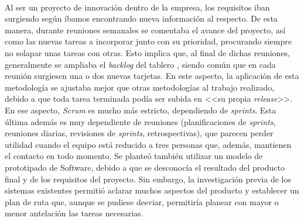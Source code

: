 \documentclass{subfiles}
\begin{document}
        \paragraph{}
        {Al ser un proyecto de innovación dentro de la empresa, los requisitos iban surgiendo según íbamos encontrando nueva información al respecto. De esta manera, durante reuniones semanales se comentaba el avance del proyecto, así como las nuevas tareas a incorporar junto con su prioridad, procurando siempre no solapar unas tareas con otras. Esto implica que, al final de dichas reuniones, generalmente se ampliaba el \textit{backlog} del tablero \Kanban, siendo común que en cada reunión surgiesen una o dos nuevas tarjetas. En este aspecto, la aplicación de esta metodología se ajustaba mejor que otras metodologías al trabajo realizado, debido a que toda tarea terminada podía ser subida en <<su propia \textit{release}>>. En ese aspecto, \textit{Scrum} es mucho más estricto, dependiendo de \textit{sprints}. Esta última además es muy dependiente de reuniones (planificaciones de \textit{sprints}, reuniones diarias, revisiones de \textit{sprints}, retrospectivas), que parecen perder utilidad cuando el equipo está reducido a tres personas que, además, mantienen el contacto en todo momento. Se planteó también utilizar un modelo de prototipado de Software, debido a que se desconocía el resultado del producto final y de los requisitos del proyecto. Sin embargo, la investigación previa de los sistemas existentes permitió aclarar muchos aspectos del producto y establecer un plan de ruta que, aunque se pudiese desviar, permitiría planear con mayor o menor antelación las tareas necesarias.}
\end{document}
